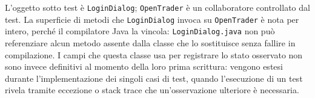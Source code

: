 L'oggetto sotto test è \texttt{LoginDialog}; \texttt{OpenTrader} è un
collaboratore controllato dal test. La superficie di metodi che \texttt{LoginDialog} invoca su
\texttt{OpenTrader} è nota per intero, perché il compilatore Java la
vincola: \texttt{LoginDialog.java} non può referenziare alcun metodo
assente dalla classe che lo sostituisce senza fallire in compilazione.
I campi che questa classe usa per registrare lo stato osservato non sono invece definitivi
al momento della loro prima scrittura: vengono estesi durante
l'implementazione dei singoli casi di test, quando l'esecuzione di un
test rivela tramite eccezione o stack trace che un'osservazione
ulteriore è necessaria.